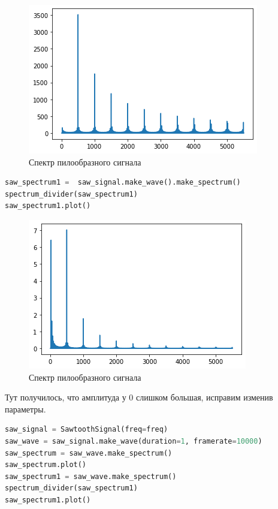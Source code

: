 \begin{figure}[H]
	\begin{center}
		\includegraphics[scale=1]{fig/lab02/lab02_42_0.png}
		\caption{Спектр пилообразного сигнала}
	\end{center}
\end{figure}

\begin{lstlisting}[language=Python]
saw_spectrum1 =  saw_signal.make_wave().make_spectrum()
spectrum_divider(saw_spectrum1)
saw_spectrum1.plot()
\end{lstlisting}

\begin{figure}[H]
	\begin{center}
		\includegraphics[scale=1]{fig/lab02/lab02_43_0.png}
		\caption{Спектр пилообразного сигнала}
	\end{center}
\end{figure}

Тут получилось, что амплитуда у 0 слишком большая, исправим изменив параметры.

\begin{lstlisting}[language=Python]
saw_signal = SawtoothSignal(freq=freq)
saw_wave = saw_signal.make_wave(duration=1, framerate=10000)
saw_spectrum = saw_wave.make_spectrum()
saw_spectrum.plot()
saw_spectrum1 = saw_wave.make_spectrum()
spectrum_divider(saw_spectrum1)
saw_spectrum1.plot()
\end{lstlisting}


